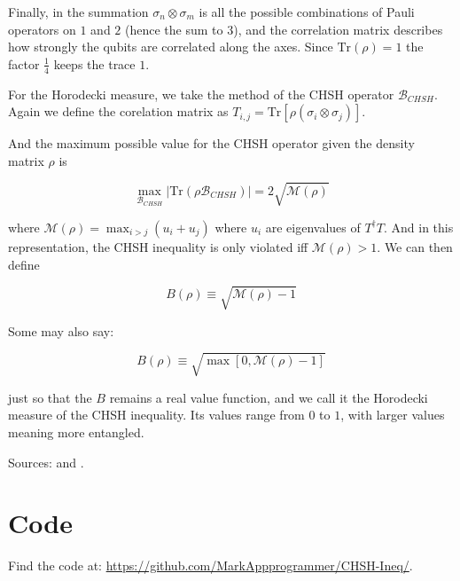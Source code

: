 \documentclass[a4paper, onecolumn, 11pt, titlepage]{quantumarticle}
\begin{document}
\begin{appendices}
Finally, in the summation  $\sigma_n \otimes \sigma_m$ is all the possible combinations of Pauli operators on $1$ and $2$ (hence the sum to $3$), and the correlation matrix describes how strongly the qubits are correlated along the axes. Since $ \text{Tr}(\rho) = 1$ the factor $\frac{1}{4}$ keeps the trace $1$.

For the Horodecki measure, we take the method of the CHSH operator $\mathcal{B}_{CHSH}$. Again we define the corelation matrix as $T_{i,j} = \text{Tr} \left[\rho \left(\sigma_i \otimes \sigma_j \right)\right]$. 

And the maximum possible value for the CHSH operator given the density matrix $\rho$ is

$$\max_{\mathcal{B}_{CHSH}}{|\text{Tr}(\rho \mathcal{B}_{CHSH})|} = 2 \sqrt{\mathcal{M}(\rho)}$$

where $\mathcal{M}(\rho) = \max_{i > j}{(u_i +u_j)}$ where $u_i$ are eigenvalues of $T^\dagger T$. And in this representation, the CHSH inequality is only violated iff $\mathcal{M}(\rho) > 1$. We can then define

$$B(\rho) \equiv \sqrt{\mathcal{M}(\rho) - 1}$$ 

Some may also say:

$$B(\rho) \equiv \sqrt{\max[0, \mathcal{M}(\rho) - 1]}$$ 

just so that the $B$ remains a real value function, and we call it the Horodecki measure of the CHSH inequality. Its values range from $0$ to $1$, with larger values meaning more entangled.

Sources: \cite{PhysRevA.88.052105} and \cite{Kalaga_2024}.


\section{Code}\label{secondappendix}
Find the code at: \href{https://github.com/MarkAppprogrammer/CHSH-Ineq/tree/main}{https://github.com/MarkAppprogrammer/CHSH-Ineq/}.
\end{appendices}
\end{document}
